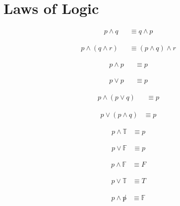 \chapter{Laws of Logic}
\label{sec:LawsOfLogic}

\begin{align}
  p \land q & 
    & \equiv q \land p
  \label{eq:Commut}
\end{align}

\begin{align}
  p \land (q \land r) &
    & \equiv (p \land q) \land r
  \label{eq:Assoc}
\end{align}

\begin{align}
  p \land p &
    & \equiv p
  \label{eq:Idemp}
\end{align}

\begin{align}
  p \lor p &
    & \equiv p
  \label{eq:Idemp2}
\end{align}

\begin{align}
  p \land (p \lor q) &
    & \equiv p
  \label{eq:Distrib}
\end{align}

\begin{align}
  p \lor (p \land q) & \equiv p
  \label{eq:Distrib2}
\end{align}

\begin{align}
  p \land \mathbb{T} & \equiv p
  \label{eq:IdentAND}
\end{align}

\begin{align}
  p \lor \mathbb{F} & \equiv p
  \label{eq:IdentOR}
\end{align}

\begin{align}
  p \land \mathbb{F} & \equiv F
  \label{eq:Annihil}
\end{align}

\begin{align}
  p \lor \mathbb{T} & \equiv T
  \label{eq:Annihil2}
\end{align}

\begin{align}
  p \land \not p & \equiv \mathbb{F}
  \label{eq:Inv1}
\end{align}

